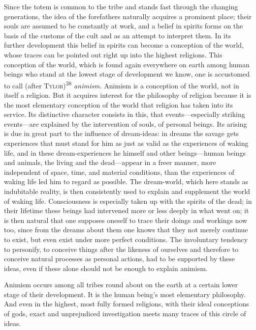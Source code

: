 \documentclass[12pt,a4paper]{book}
\newcommand{\opage}[1]{\marginnote{\footnotesize\textit{[#1]}}}
\begin{document}
Since the totem is common to the tribe and stands fast through the changing
generations, the idea of the forefathers naturally acquires a prominent place; their
souls are assumed to be constantly at work, and a belief in spirits forms on the basis
of the customs of the cult and as an attempt to interpret them. In its further
development this belief in spirits can become a conception of the world, whose traces
can be pointed out right up into the highest religions. This conception of the world,
which is found again everywhere on earth among human beings who stand at the lowest
stage of development we know, one is accustomed to call (after
\textsc{Tylor})\textsuperscript{38} \emph{animism.} Animism is a conception of the
world, not in itself a religion. But it acquires interest for the philosophy of
religion because it is the most elementary 
\opage{88}conception of the world that religion has
taken into its service. Its distinctive character consists in this, that
events---especially striking events---are explained by the intervention of souls, of
personal beings. Its arising is due in great part to the influence of dream-ideas: in
dreams the savage gets experiences that must stand for him as just as valid as the
experiences of waking life, and in these dream-experiences he himself and other
beings---human beings and animals, the living and the dead---appear in a freer manner,
more independent of space, time, and material conditions, than the experiences of
waking life led him to regard as possible. The dream-world, which here stands as
indubitable reality, is then consistently used to explain and supplement the world of
waking life. Consciousness is especially taken up with the spirits of the dead; in
their lifetime these beings had intervened more or less deeply in what went on; it is
then natural that one supposes oneself to trace their doings and workings now too,
since from the dreams about them one knows that they not merely continue to exist, but
even exist under more perfect conditions. The involuntary tendency to personify, to
conceive things after the likeness of ourselves and therefore to conceive natural
processes as personal actions, had to be supported by these ideas, even if these alone
should not be enough to explain animism.

Animism occurs among all tribes round about on the earth at a certain lower stage of
their development. It is the human being's most elementary philosophy. And even in the
highest, most fully formed religions, with their ideal conceptions of gods, exact and
unprejudiced investigation meets many traces of this circle of ideas.
\end{document}
